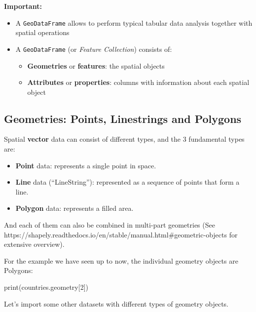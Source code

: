 \documentclass[
  letterpaper,
  DIV=11,
  numbers=noendperiod]{scrreprt}
\newenvironment{Shaded}{\begin{snugshade}}{\end{snugshade}}
\newcommand{\BuiltInTok}[1]{\textcolor[rgb]{0.00,0.23,0.31}{#1}}
\newcommand{\DecValTok}[1]{\textcolor[rgb]{0.68,0.00,0.00}{#1}}
\newcommand{\NormalTok}[1]{\textcolor[rgb]{0.00,0.23,0.31}{#1}}
\providecommand{\tightlist}{%
  \setlength{\itemsep}{0pt}\setlength{\parskip}{0pt}}\usepackage{longtable,booktabs,array}
\begin{document}
\textbf{Important:}

\begin{itemize}
\tightlist
\item
  A \texttt{GeoDataFrame} allows to perform typical tabular data
  analysis together with spatial operations
\item
  A \texttt{GeoDataFrame} (or \emph{Feature Collection}) consists of:

  \begin{itemize}
  \tightlist
  \item
    \textbf{Geometries} or \textbf{features}: the spatial objects
  \item
    \textbf{Attributes} or \textbf{properties}: columns with information
    about each spatial object
  \end{itemize}
\end{itemize}

\subsection{Geometries: Points, Linestrings and
Polygons}\label{geometries-points-linestrings-and-polygons}

Spatial \textbf{vector} data can consist of different types, and the 3
fundamental types are:

\begin{itemize}
\tightlist
\item
  \textbf{Point} data: represents a single point in space.
\item
  \textbf{Line} data (``LineString''): represented as a sequence of
  points that form a line.
\item
  \textbf{Polygon} data: represents a filled area.
\end{itemize}

And each of them can also be combined in multi-part geometries (See
https://shapely.readthedocs.io/en/stable/manual.html\#geometric-objects
for extensive overview).

For the example we have seen up to now, the individual geometry objects
are Polygons:

\begin{Shaded}
\begin{Highlighting}[]
\BuiltInTok{print}\NormalTok{(countries.geometry[}\DecValTok{2}\NormalTok{])}
\end{Highlighting}
\end{Shaded}

Let's import some other datasets with different types of geometry
objects.
\end{document}
